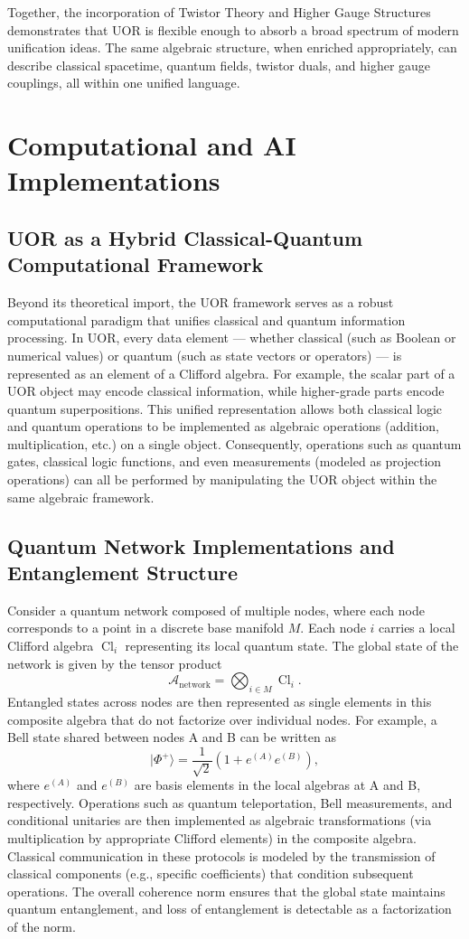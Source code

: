 \documentclass[12pt]{article}
\newcommand{\Cl}{\operatorname{Cl}}
\begin{document}
Together, the incorporation of Twistor Theory and Higher Gauge Structures demonstrates that UOR is flexible enough to absorb a broad spectrum of modern unification ideas. The same algebraic structure, when enriched appropriately, can describe classical spacetime, quantum fields, twistor duals, and higher gauge couplings, all within one unified language.

\section{Computational and AI Implementations}

\subsection{UOR as a Hybrid Classical-Quantum Computational Framework}
Beyond its theoretical import, the UOR framework serves as a robust computational paradigm that unifies classical and quantum information processing. In UOR, every data element --- whether classical (such as Boolean or numerical values) or quantum (such as state vectors or operators) --- is represented as an element of a Clifford algebra. For example, the scalar part of a UOR object may encode classical information, while higher-grade parts encode quantum superpositions. This unified representation allows both classical logic and quantum operations to be implemented as algebraic operations (addition, multiplication, etc.) on a single object. Consequently, operations such as quantum gates, classical logic functions, and even measurements (modeled as projection operations) can all be performed by manipulating the UOR object within the same algebraic framework.

\subsection{Quantum Network Implementations and Entanglement Structure}
Consider a quantum network composed of multiple nodes, where each node corresponds to a point in a discrete base manifold $M$. Each node $i$ carries a local Clifford algebra $\Cl_i$ representing its local quantum state. The global state of the network is given by the tensor product 
\[
\mathcal{A}_{\text{network}} = \bigotimes_{i \in M} \Cl_i.
\]
Entangled states across nodes are then represented as single elements in this composite algebra that do not factorize over individual nodes. For example, a Bell state shared between nodes A and B can be written as 
\[
|\Phi^+\rangle = \frac{1}{\sqrt{2}}(1 + e^{(A)}e^{(B)}),
\]
where $e^{(A)}$ and $e^{(B)}$ are basis elements in the local algebras at A and B, respectively. Operations such as quantum teleportation, Bell measurements, and conditional unitaries are then implemented as algebraic transformations (via multiplication by appropriate Clifford elements) in the composite algebra. Classical communication in these protocols is modeled by the transmission of classical components (e.g., specific coefficients) that condition subsequent operations. The overall coherence norm ensures that the global state maintains quantum entanglement, and loss of entanglement is detectable as a factorization of the norm.
\end{document}
